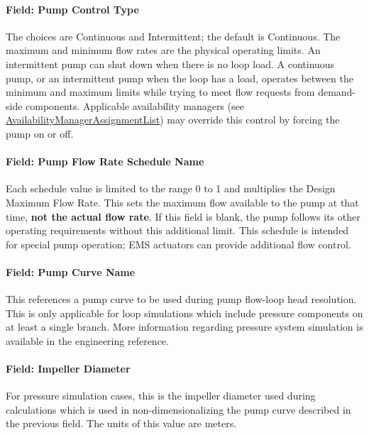 \paragraph{Field: Pump Control Type}\label{field-pump-control-type-000}

The choices are Continuous and Intermittent; the default is Continuous. The maximum and minimum flow rates are the physical operating limits. An intermittent pump can shut down when there is no loop load. A continuous pump, or an intermittent pump when the loop has a load, operates between the minimum and maximum limits while trying to meet flow requests from demand-side components. Applicable availability managers (see \hyperref[availabilitymanagerassignmentlist]{AvailabilityManagerAssignmentList}) may override this control by forcing the pump on or off.

\paragraph{Field: Pump Flow Rate Schedule Name}\label{field-pump-flow-rate-schedule-name-000}

Each schedule value is limited to the range 0 to 1 and multiplies the Design Maximum Flow Rate. This sets the maximum flow available to the pump at that time, \textbf{not the actual flow rate}. If this field is blank, the pump follows its other operating requirements without this additional limit. This schedule is intended for special pump operation; EMS actuators can provide additional flow control.

\paragraph{Field: Pump Curve Name}\label{field-pump-curve-name}

This references a pump curve to be used during pump flow-loop head resolution. This is only applicable for loop simulations which include pressure components on at least a single branch. More information regarding pressure system simulation is available in the engineering reference.

\paragraph{Field: Impeller Diameter}\label{field-impeller-diameter}

For pressure simulation cases, this is the impeller diameter used during calculations which is used in non-dimensionalizing the pump curve described in the previous field. The units of this value are meters.

